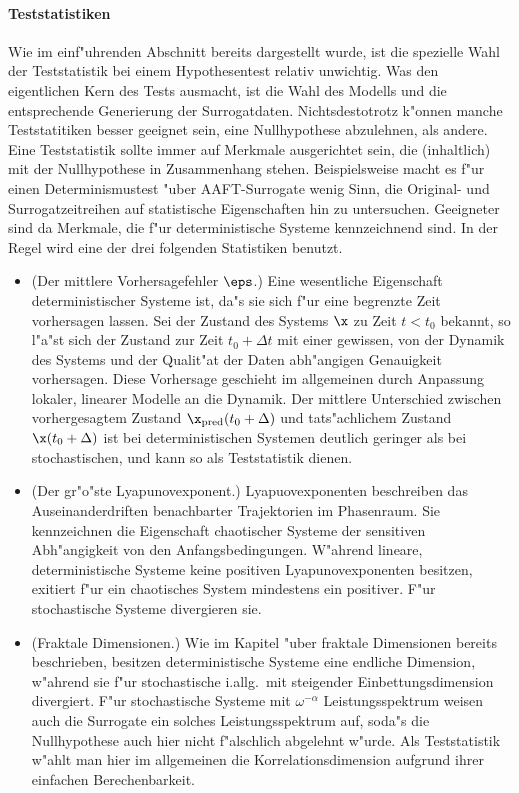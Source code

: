 \paragraph{Teststatistiken}
Wie im einf"uhrenden Abschnitt bereits dargestellt wurde, ist die spezielle Wahl der
Teststatistik bei einem Hypothesentest relativ unwichtig. Was den eigentlichen Kern des
Tests ausmacht, ist die Wahl des Modells und die entsprechende Generierung der
Surrogatdaten. Nichtsdestotrotz k"onnen manche Teststatitiken besser geeignet sein, eine
Nullhypothese abzulehnen, als andere. Eine Teststatistik sollte immer auf Merkmale
ausgerichtet sein, die \naja(inhaltlich) mit der Nullhypothese in Zusammenhang stehen.
Beispielsweise macht es f"ur einen Determinismustest "uber AAFT-Surrogate wenig Sinn, die
Original- und Surrogatzeitreihen auf statistische Eigenschaften hin zu untersuchen.
Geeigneter sind da Merkmale, die f"ur deterministische Systeme kennzeichnend sind. In der
Regel wird eine der drei folgenden Statistiken benutzt.
\begin{itemize}
\item \rem(Der mittlere Vorhersagefehler $\eps$.) Eine wesentliche Eigenschaft deterministischer 
  Systeme ist, da"s sie sich f"ur eine begrenzte Zeit vorhersagen lassen. Sei der Zustand
  des Systems $\x$ zu Zeit $t<t_0$ bekannt, so l"a"st sich der Zustand zur Zeit
  $t_0+\Delta t$ mit einer gewissen, von der Dynamik des Systems und der Qualit"at der
  Daten abh"angigen Genauigkeit vorhersagen. Diese Vorhersage geschieht im allgemeinen
  durch Anpassung lokaler, linearer Modelle an die Dynamik. Der mittlere Unterschied zwischen vorhergesagtem Zustand
  $\x_\mathrm{pred}(t_0+\Delta)$ und tats"achlichem Zustand $\x(t_0+\Delta)$ ist bei
  deterministischen Systemen deutlich geringer als bei stochastischen, und kann so als
  Teststatistik dienen. 
\item \rem(Der gr"o"ste Lyapunovexponent.) Lyapuovexponenten beschreiben das
  Auseinanderdriften benachbarter Trajektorien im Phasenraum. Sie kennzeichnen die
  Eigenschaft chaotischer Systeme der sensitiven Abh"angigkeit von den
  Anfangsbedingungen. W"ahrend lineare, deterministische Systeme keine positiven
  Lyapunovexponenten besitzen, exitiert f"ur ein chaotisches System mindestens ein
  positiver. F"ur stochastische Systeme divergieren sie. 
\item \rem(Fraktale Dimensionen.) Wie im Kapitel "uber fraktale Dimensionen bereits
  beschrieben, besitzen deterministische Systeme eine endliche Dimension, w"ahrend sie
  f"ur stochastische i.allg.\ mit steigender Einbettungsdimension divergiert. F"ur
  stochastische Systeme mit $\omega^{-\alpha}$ Leistungsspektrum weisen auch die Surrogate
  ein solches Leistungsspektrum auf, soda"s die Nullhypothese auch hier nicht f"alschlich
  abgelehnt w"urde. Als Teststatistik w"ahlt man hier im allgemeinen die
  Korrelationsdimension aufgrund ihrer einfachen Berechenbarkeit.
\end{itemize}
